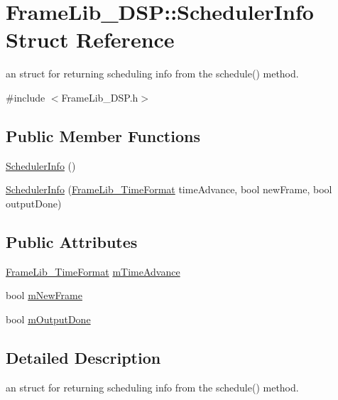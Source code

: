 \hypertarget{struct_frame_lib___d_s_p_1_1_scheduler_info}{}\section{Frame\+Lib\+\_\+\+D\+SP\+:\+:Scheduler\+Info Struct Reference}
\label{struct_frame_lib___d_s_p_1_1_scheduler_info}


an struct for returning scheduling info from the schedule() method.  




{\ttfamily \#include $<$Frame\+Lib\+\_\+\+D\+S\+P.\+h$>$}

\subsection*{Public Member Functions}
\begin{DoxyCompactItemize}
\item 
\hyperlink{struct_frame_lib___d_s_p_1_1_scheduler_info_a5939a752d4ea50eea67c019805254a82}{Scheduler\+Info} ()
\item 
\hyperlink{struct_frame_lib___d_s_p_1_1_scheduler_info_a82a4ba6533c2d663620c4276b7d27dce}{Scheduler\+Info} (\hyperlink{struct_frame_lib___time_format}{Frame\+Lib\+\_\+\+Time\+Format} time\+Advance, bool new\+Frame, bool output\+Done)
\end{DoxyCompactItemize}
\subsection*{Public Attributes}
\begin{DoxyCompactItemize}
\item 
\hyperlink{struct_frame_lib___time_format}{Frame\+Lib\+\_\+\+Time\+Format} \hyperlink{struct_frame_lib___d_s_p_1_1_scheduler_info_ae38d8335efc201f8c2c967ffea7b6076}{m\+Time\+Advance}
\item 
bool \hyperlink{struct_frame_lib___d_s_p_1_1_scheduler_info_a88fa8b1c2060d60f4ae1cf164405c85f}{m\+New\+Frame}
\item 
bool \hyperlink{struct_frame_lib___d_s_p_1_1_scheduler_info_aee41d636cde5b117b4ce8610905d668d}{m\+Output\+Done}
\end{DoxyCompactItemize}


\subsection{Detailed Description}
an struct for returning scheduling info from the schedule() method. 

